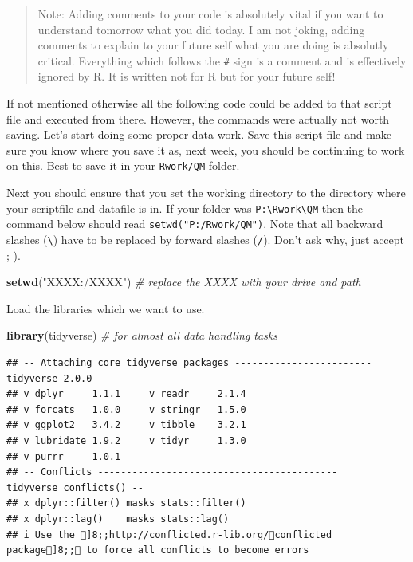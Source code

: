 \documentclass[
]{article}
\newenvironment{Shaded}{\begin{snugshade}}{\end{snugshade}}
\newcommand{\CommentTok}[1]{\textcolor[rgb]{0.56,0.35,0.01}{\textit{#1}}}
\newcommand{\FunctionTok}[1]{\textcolor[rgb]{0.13,0.29,0.53}{\textbf{#1}}}
\newcommand{\NormalTok}[1]{#1}
\newcommand{\StringTok}[1]{\textcolor[rgb]{0.31,0.60,0.02}{#1}}
\begin{document}
\begin{quote}
Note: Adding comments to your code is absolutely vital if you want to
understand tomorrow what you did today. I am not joking, adding comments
to explain to your future self what you are doing is absolutly critical.
Everything which follows the \texttt{\#} sign is a comment and is
effectively ignored by R. It is written not for R but for your future
self!
\end{quote}

If not mentioned otherwise all the following code could be added to that
script file and executed from there. However, the commands were actually
not worth saving. Let's start doing some proper data work. Save this
script file and make sure you know where you save it as, next week, you
should be continuing to work on this. Best to save it in your
\texttt{Rwork/QM} folder.

Next you should ensure that you set the working directory to the
directory where your scriptfile and datafile is in. If your folder was
\texttt{P:\textbackslash{}Rwork\textbackslash{}QM} then the command
below should read \texttt{setwd("P:/Rwork/QM")}. Note that all backward
slashes (\texttt{\textbackslash{}}) have to be replaced by forward
slashes (\texttt{/}). Don't ask why, just accept ;-).

\begin{Shaded}
\begin{Highlighting}[]
\FunctionTok{setwd}\NormalTok{(}\StringTok{"XXXX:/XXXX"}\NormalTok{)   }\CommentTok{\# replace the XXXX with your drive and path}
\end{Highlighting}
\end{Shaded}

Load the libraries which we want to use.

\begin{Shaded}
\begin{Highlighting}[]
\FunctionTok{library}\NormalTok{(tidyverse)    }\CommentTok{\# for almost all data handling tasks}
\end{Highlighting}
\end{Shaded}

\begin{verbatim}
## -- Attaching core tidyverse packages ------------------------ tidyverse 2.0.0 --
## v dplyr     1.1.1     v readr     2.1.4
## v forcats   1.0.0     v stringr   1.5.0
## v ggplot2   3.4.2     v tibble    3.2.1
## v lubridate 1.9.2     v tidyr     1.3.0
## v purrr     1.0.1     
## -- Conflicts ------------------------------------------ tidyverse_conflicts() --
## x dplyr::filter() masks stats::filter()
## x dplyr::lag()    masks stats::lag()
## i Use the ]8;;http://conflicted.r-lib.org/conflicted package]8;; to force all conflicts to become errors
\end{verbatim}
\end{document}
